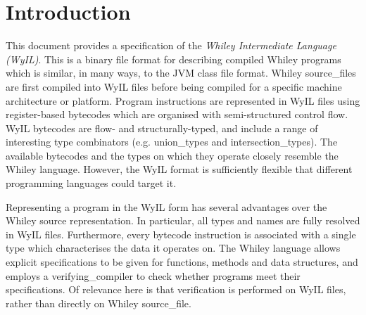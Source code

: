 \chapter{Introduction}

This document provides a specification of the {\em Whiley Intermediate Language (WyIL)}.  This is a binary file format for describing compiled Whiley programs which is similar, in many ways, to the JVM class file format.  Whiley \glspl{source_file} are first compiled into WyIL files before being compiled for a specific machine architecture or platform.  Program instructions are represented in WyIL files using register-based bytecodes which are organised with semi-structured control flow.  WyIL bytecodes are flow- and structurally-typed, and include a range of interesting type combinators (e.g. \glspl{union_type} and \glspl{intersection_type}).  The available bytecodes and the types on which they operate closely resemble the Whiley language.  However, the WyIL format is sufficiently flexible that different programming languages could target it.  

Representing a program in the WyIL form has several advantages over the Whiley source representation.  In particular, all types and names are fully resolved in WyIL files.  Furthermore, every bytecode instruction is associated with a single type which characterises the data it operates on.  The Whiley language allows explicit specifications to be given for functions, methods and data structures, and employs a \gls{verifying_compiler} to check whether programs meet their specifications.  Of relevance here is that verification is performed on WyIL files, rather than directly on Whiley \gls{source_file}.


